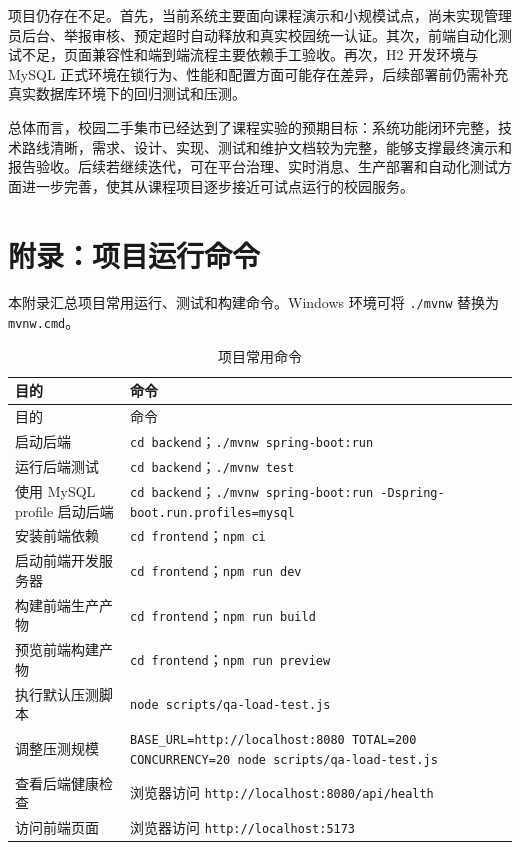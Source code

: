 ﻿\documentclass[UTF8,a4paper,12pt]{ctexart}
\newcommand{\projectname}{校园二手集市}
\begin{document}
项目仍存在不足。首先，当前系统主要面向课程演示和小规模试点，尚未实现管理员后台、举报审核、预定超时自动释放和真实校园统一认证。其次，前端自动化测试不足，页面兼容性和端到端流程主要依赖手工验收。再次，H2 开发环境与 MySQL 正式环境在锁行为、性能和配置方面可能存在差异，后续部署前仍需补充真实数据库环境下的回归测试和压测。

总体而言，\projectname{}已经达到了课程实验的预期目标：系统功能闭环完整，技术路线清晰，需求、设计、实现、测试和维护文档较为完整，能够支撑最终演示和报告验收。后续若继续迭代，可在平台治理、实时消息、生产部署和自动化测试方面进一步完善，使其从课程项目逐步接近可试点运行的校园服务。

\newpage
\appendix

\section{附录：项目运行命令}
本附录汇总项目常用运行、测试和构建命令。Windows 环境可将 \texttt{./mvnw} 替换为 \texttt{mvnw.cmd}。

\begin{longtable}{p{4cm}p{9cm}}
  \caption{项目常用命令} \\
  \toprule
  目的 & 命令 \\
  \midrule
  \endfirsthead
  \toprule
  目的 & 命令 \\
  \midrule
  \endhead
  启动后端 & \texttt{cd backend}；\texttt{./mvnw spring-boot:run} \\
  运行后端测试 & \texttt{cd backend}；\texttt{./mvnw test} \\
  使用 MySQL profile 启动后端 & \texttt{cd backend}；\texttt{./mvnw spring-boot:run -Dspring-boot.run.profiles=mysql} \\
  安装前端依赖 & \texttt{cd frontend}；\texttt{npm ci} \\
  启动前端开发服务器 & \texttt{cd frontend}；\texttt{npm run dev} \\
  构建前端生产产物 & \texttt{cd frontend}；\texttt{npm run build} \\
  预览前端构建产物 & \texttt{cd frontend}；\texttt{npm run preview} \\
  执行默认压测脚本 & \texttt{node scripts/qa-load-test.js} \\
  调整压测规模 & \texttt{BASE\_URL=http://localhost:8080 TOTAL=200 CONCURRENCY=20 node scripts/qa-load-test.js} \\
  查看后端健康检查 & 浏览器访问 \texttt{http://localhost:8080/api/health} \\
  访问前端页面 & 浏览器访问 \texttt{http://localhost:5173} \\
  \bottomrule
\end{longtable}
\end{document}

